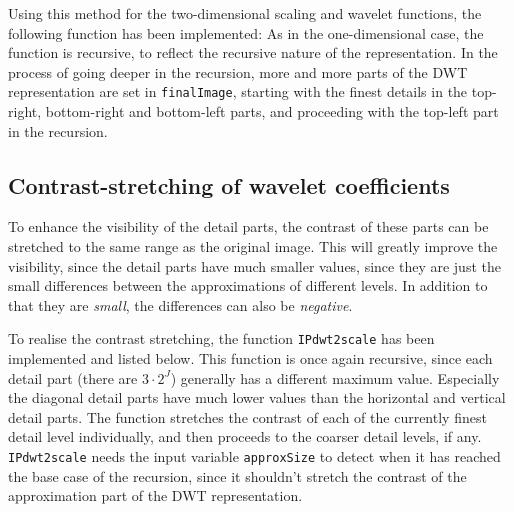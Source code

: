 Using this method for the two-dimensional scaling and wavelet functions, the following function has been implemented:
As in the one-dimensional case, the function is recursive, to reflect the recursive nature of the representation.
In the process of going deeper in the recursion, more and more parts of the DWT representation are set in \texttt{finalImage}, starting with the finest details in the top-right, bottom-right and bottom-left parts, and proceeding with the top-left part in the recursion.

\subsection{Contrast-stretching of wavelet coefficients}
To enhance the visibility of the detail parts, the contrast of these parts can be stretched to the same range as the original image.
This will greatly improve the visibility, since the detail parts have much smaller values, since they are just the small differences between the approximations of different levels. In addition to that they are \emph{small}, the differences can also be \emph{negative}.

To realise the contrast stretching, the function \texttt{IPdwt2scale} has been implemented and listed below. This function is once again recursive, since each detail part (there are \(3\cdot2^J\)) generally has a different maximum value. Especially the diagonal detail parts have much lower values than the horizontal and vertical detail parts.
The function stretches the contrast of each of the currently finest detail level individually, and then proceeds to the coarser detail levels, if any. \texttt{IPdwt2scale} needs the input variable \texttt{approxSize} to detect when it has reached the base case of the recursion, since it shouldn't stretch the contrast of the approximation part of the DWT representation.

